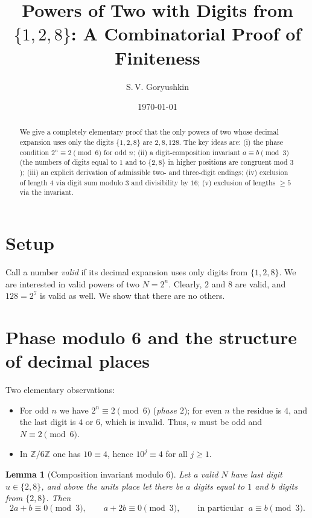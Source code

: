 \documentclass[12pt]{article}
\title{Powers of Two with Digits from $\{1,2,8\}$: A Combinatorial Proof of Finiteness}
\author{S.\,V. Goryushkin}
\date{\today}
\theoremstyle{plain}
\newtheorem{lemma}{Lemma}
\theoremstyle{remark}
\begin{document}
\maketitle

\begin{abstract}
We give a completely elementary proof that the only powers of two whose decimal expansion uses only the digits $\{1,2,8\}$ are $2,8,128$. The key ideas are: (i) the phase condition $2^n\equiv2\pmod6$ for odd $n$; (ii) a digit-composition invariant $a\equiv b\pmod3$ (the numbers of digits equal to $1$ and to $\{2,8\}$ in higher positions are congruent mod $3$); (iii) an explicit derivation of admissible two- and three-digit endings; (iv) exclusion of length $4$ via digit sum modulo $3$ and divisibility by $16$; (v) exclusion of lengths $\ge5$ via the invariant.
\end{abstract}

\section{Setup}
Call a number \emph{valid} if its decimal expansion uses only digits from $\{1,2,8\}$. We are interested in valid powers of two $N=2^n$. Clearly, $2$ and $8$ are valid, and $128=2^7$ is valid as well. We show that there are no others.

\section{Phase modulo 6 and the structure of decimal places}
Two elementary observations:
\begin{itemize}[nosep]
\item For odd $n$ we have $2^n\equiv 2\pmod6$ (\emph{phase $2$}); for even $n$ the residue is $4$, and the last digit is $4$ or $6$, which is invalid. Thus, $n$ must be odd and $N\equiv2\pmod6$.
\item In $\mathbb Z/6\mathbb Z$ one has $10\equiv4$, hence $10^j\equiv4$ for all $j\ge1$.
\end{itemize}

\begin{lemma}[Composition invariant modulo 6]\label{lem:inv}
Let a valid $N$ have last digit $u\in\{2,8\}$, and above the units place let there be $a$ digits equal to $1$ and $b$ digits from $\{2,8\}$. Then
\begin{equation}\label{eq:ab}
2a+b\equiv0\pmod3,\qquad a+2b\equiv0\pmod3,\qquad\text{in particular }~ a\equiv b\pmod3.
\end{equation}
\end{lemma}
\end{document}
